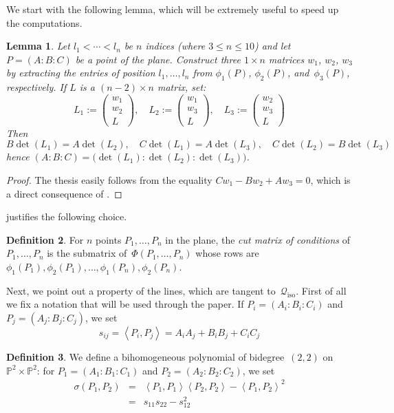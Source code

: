 \documentclass{amsart}
\theoremstyle{plain}
\newtheorem{lemma}{Lemma}[section]
\theoremstyle{definition}
\newtheorem{definition}[lemma]{Definition}
\newcommand{\p}{\mathbb{P}}
\newcommand{\iso}{\mathcal{Q}_{\mathrm{iso}}}
\newcommand{\scl}[2]{\left\langle {#1}, {#2} \right\rangle}
\begin{document}
We start with the following lemma, which will be extremely useful
to speed up the computations.

\begin{lemma}
\label{lemma:minors}
Let $l_1 < \cdots <l_n$ be $n$ indices (where $3 \leq n \leq 10$) and let $P = (A: B: C)$ be a point of the plane.
Construct three $1 \times n$ matrices $w_1$, $w_2$, $w_3$ by extracting the entries of position $l_1, \dotsc, l_n$ from $\phi_1(P)$, $\phi_2(P)$, and~$\phi_3(P)$, respectively. If $L$ is a $(n-2) \times n$ matrix, set:
  \[
  L_1 := \left(\begin{array}{c}w_1 \\ w_2 \\ L\end{array}  \right), \quad
  L_2 := \left(\begin{array}{c}w_1 \\ w_3 \\ L\end{array}  \right), \quad
  L_3 := \left(\begin{array}{c}w_2 \\ w_3 \\ L\end{array}  \right)
  \]
  Then
  \[
  B \det(L_1) = A \det(L_2), \quad
  C \det(L_1) = A \det(L_3), \quad
  C \det(L_2) = B \det(L_3)
  \]
  hence $(A: B: C) = \bigl( \det(L_1): \det(L_2): \det(L_3) \bigr)$.
\end{lemma}
\begin{proof}
  The thesis easily follows from the equality $C w_1 - B w_2 + A w_3 = 0$, which is a direct consequence of .
\end{proof}

 justifies the following choice.

\begin{definition}
 \label{definition:reduced_matrix_conditions}
 For $n$ points $P_1, \dotsc, P_n$ in the plane, the \emph{cut matrix of conditions} of $P_1, \dotsc, P_n$ is the submatrix of~$\Phi(P_1, \dotsc, P_n)$ whose rows are $\phi_1(P_1), \phi_2(P_1), \dotsc, \phi_1(P_n), \phi_2(P_n)$.
\end{definition}

Next, we point out a property of the lines, which are tangent to~$\iso$.
First of all we fix a notation that will be used through the paper. If
$P_i = (A_i: B_i: C_i)$ and $P_j = (A_j: B_j: C_j)$, we set
\[
s_{ij} = \scl{P_i}{P_j} = A_i A_j + B_i B_j + C_i C_j
\]

\begin{definition}
\label{definition:sigma}
We define a bihomogeneous polynomial of bidegree~$(2,2)$ on $\p^2 \times \p^2$: for $P_1 = (A_1: B_1: C_1)$ and $P_2 = (A_2: B_2: C_2)$, we set
%
\begin{eqnarray}
\label{formula:sigma}
  \sigma(P_1, P_2) &=& \scl{P_1}{P_1} \scl{P_2}{P_2} - \scl{P_1}{P_2}^2 \\
   & = & s_{11}s_{22}-s_{12}^2
\end{eqnarray}
\end{definition}
\end{document}
